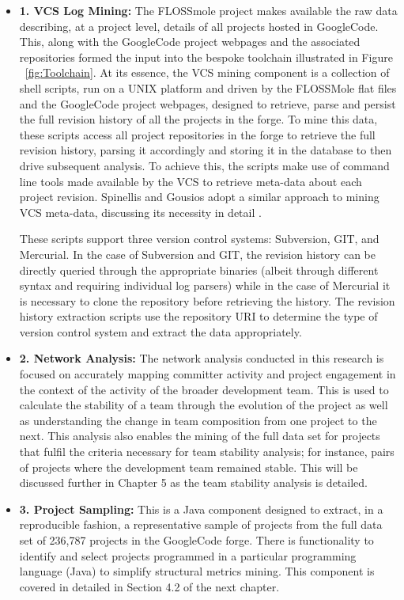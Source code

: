 \begin{itemize}
\item \textbf{1. VCS Log Mining:} The FLOSSmole project makes available the raw data describing, at a project level, details of all projects hosted in GoogleCode. This, along with the GoogleCode project webpages and the associated repositories formed the input into the bespoke toolchain illustrated in Figure ~\ref{fig:Toolchain}. At its essence, the VCS mining component is a collection of shell scripts, run on a UNIX platform and driven by the FLOSSMole flat files and the GoogleCode project webpages, designed to retrieve, parse and persist the full revision history of all the projects in the forge. To mine this data, these scripts access all project repositories in the forge to retrieve the full revision history, parsing it accordingly and storing it in the database to then drive subsequent analysis. To achieve this, the scripts make use of command line tools made available by the VCS to retrieve meta-data about each project revision. Spinellis and Gousios adopt a similar approach to mining VCS meta-data, discussing its necessity in detail \citep{spinellis2018analyze}.

These scripts support three version control systems: Subversion, GIT, and Mercurial. In the case of Subversion and GIT, the revision history can be directly queried through the appropriate binaries (albeit through different syntax and requiring individual log parsers) while in the case of Mercurial it is necessary to clone the repository before retrieving the history. The revision history extraction scripts use the repository URI to determine the type of version control system and extract the data appropriately.

\item \textbf{2. Network Analysis:} The network analysis conducted in this research is focused on accurately mapping committer activity and project engagement in the context of the activity of the broader development team. This is used to calculate the stability of a team through the evolution of the project as well as understanding the change in team composition from one project to the next. This analysis also enables the mining of the full data set for projects that fulfil the criteria necessary for team stability analysis; for instance, pairs of projects where the development team remained stable. This will be discussed further in Chapter 5 as the team stability analysis is detailed.

\item \textbf{3. Project Sampling:} This is a Java component designed to extract, in a reproducible fashion, a representative sample of projects from the full data set of 236,787 projects in the GoogleCode forge. There is functionality to identify and select projects programmed in a particular programming language (Java) to simplify structural metrics mining. This component is covered in detailed in Section 4.2 of the next chapter.


\end{itemize}
